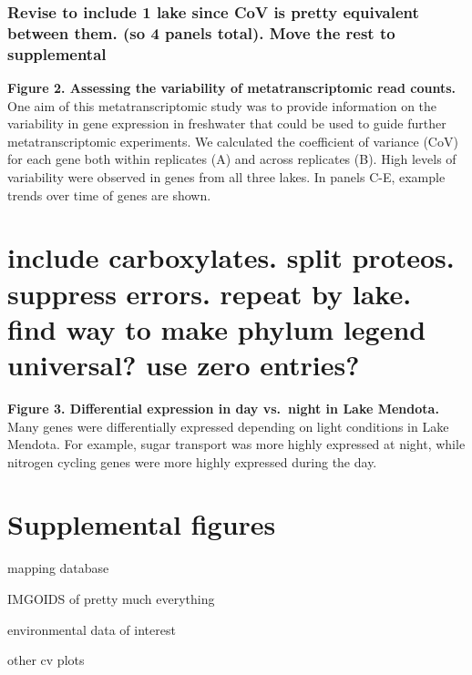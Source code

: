 \documentclass[]{article}
\begin{document}
\subsubsection{Revise to include 1 lake since CoV is pretty equivalent
between them. (so 4 panels total). Move the rest to
supplemental}\label{revise-to-include-1-lake-since-cov-is-pretty-equivalent-between-them.-so-4-panels-total.-move-the-rest-to-supplemental}

\textbf{Figure 2. Assessing the variability of metatranscriptomic read
counts.} One aim of this metatranscriptomic study was to provide
information on the variability in gene expression in freshwater that
could be used to guide further metatranscriptomic experiments. We
calculated the coefficient of variance (CoV) for each gene both within
replicates (A) and across replicates (B). High levels of variability
were observed in genes from all three lakes. In panels C-E, example
trends over time of genes are shown.

\section{include carboxylates. split proteos. suppress errors. repeat by
lake. find way to make phylum legend universal? use zero
entries?}\label{include-carboxylates.-split-proteos.-suppress-errors.-repeat-by-lake.-find-way-to-make-phylum-legend-universal-use-zero-entries}

\textbf{Figure 3. Differential expression in day vs.~night in Lake
Mendota.} Many genes were differentially expressed depending on light
conditions in Lake Mendota. For example, sugar transport was more highly
expressed at night, while nitrogen cycling genes were more highly
expressed during the day.

\section{Supplemental figures}\label{supplemental-figures}

mapping database

IMGOIDS of pretty much everything

environmental data of interest

other cv plots
\end{document}
